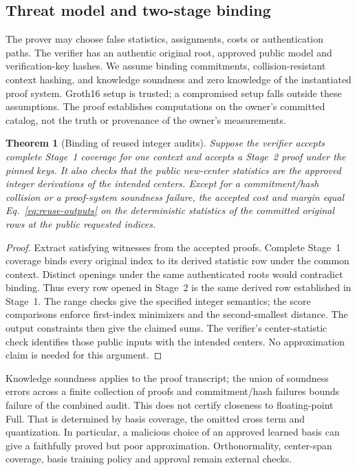 \documentclass[5p,times,twocolumn]{elsarticle}
\theoremstyle{plain}
\newtheorem{theorem}{Theorem}
\theoremstyle{definition}
\theoremstyle{remark}
\begin{document}
\subsection{\textcolor{RevisionRed}{Threat model and two-stage binding}}
\begingroup\color{RevisionRed}
The prover may choose false statistics, assignments, costs or authentication paths. The verifier has an authentic original root, approved public model and verification-key hashes. We assume binding commitments, collision-resistant context hashing, and knowledge soundness and zero knowledge of the instantiated proof system. Groth16 setup is trusted; a compromised setup falls outside these assumptions. The proof establishes computations on the owner's committed catalog, not the truth or provenance of the owner's measurements.


\par\endgroup
\begingroup\color{RevisionRed}
\begin{theorem}[Binding of reused integer audits]\label{thm:binding}
Suppose the verifier accepts complete Stage~1 coverage for one context and accepts a Stage~2 proof under the pinned keys. It also checks that the public new-center statistics are the approved integer derivations of the intended centers. Except for a commitment/hash collision or a proof-system soundness failure, the accepted cost and margin equal Eq.~\eqref{eq:reuse-outputs} on the deterministic statistics of the committed original rows at the public requested indices.
\end{theorem}
\begin{proof}
Extract satisfying witnesses from the accepted proofs. Complete Stage~1 coverage binds every original index to its derived statistic row under the common context. Distinct openings under the same authenticated roots would contradict binding. Thus every row opened in Stage~2 is the same derived row established in Stage~1. The range checks give the specified integer semantics; the score comparisons enforce first-index minimizers and the second-smallest distance. The output constraints then give the claimed sums. The verifier's center-statistic check identifies those public inputs with the intended centers. No approximation claim is needed for this argument.
\end{proof}


\par\endgroup
\begingroup\color{RevisionRed}
Knowledge soundness applies to the proof transcript; the union of soundness errors across a finite collection of proofs and commitment/hash failures bounds failure of the combined audit. This does not certify closeness to floating-point Full. That is determined by basis coverage, the omitted cross term and quantization. In particular, a malicious choice of an approved learned basis can give a faithfully proved but poor approximation. Orthonormality, center-span coverage, basis training policy and approval remain external checks.
\end{document}
